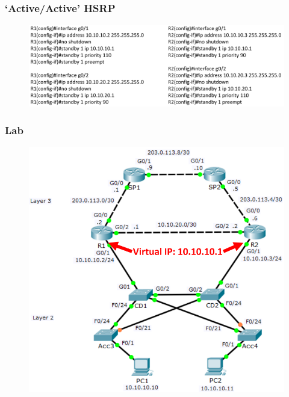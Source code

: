 \documentclass[pdflatex,compress,mathserif]{beamer}
\begin{document}
\begin{frame}
	\frametitle{‘Active/Active’ HSRP}
	\begin{figure}
		\centering
		\includegraphics[width=\linewidth]{img/img18}
	\end{figure}
\end{frame}

\begin{frame}
	\frametitle{Lab}
	\begin{figure}
		\centering
		\includegraphics[width=0.6\linewidth]{img/img19}
	\end{figure}
\end{frame}
\end{document}
